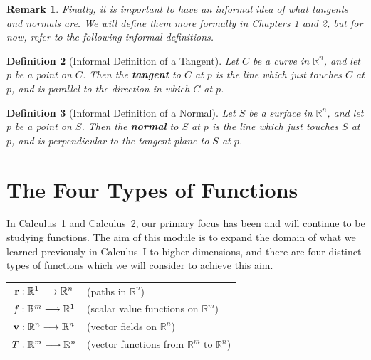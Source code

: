\documentclass[12pt]{book}
\newcommand{\rbb}{\mathbb{R}}
\newcommand{\rbbn}{\mathbb{R}^n}
\theoremstyle{definitionstyle}
\newtheorem{definition}{Definition}[section]
\newtheorem{remark}[definition]{Remark}
\numberwithin{equation}{section}
\begin{document}
\vspace{0.5cm}

\begin{remark}
    Finally, it is important to have an informal idea of what tangents and normals are. We will define them more formally in Chapters 1 and 2, but for now, refer to the following informal definitions.
\end{remark}

\vspace{0.5cm}

\begin{definition}[Informal Definition of a Tangent] 
    \noindent
    \setlength{\hangindent}{0pt}
    Let $C$ be a curve in $\rbb^n$, and let $p$ be a point on $C$. Then the \textbf{tangent} to $C$ at $p$ is the line which just touches $C$ at $p$, and is parallel to the direction in which $C$ at $p$.
\end{definition}

\vspace{0.5cm}

\begin{definition}[Informal Definition of a Normal]
    \noindent
    \setlength{\hangindent}{0pt}
    Let $S$ be a surface in $\rbb^n$, and let $p$ be a point on $S$. Then the \textbf{normal} to $S$ at $p$ is the line which just touches $S$ at $p$, and is perpendicular to the tangent plane to $S$ at $p$.
\end{definition}

\newpage

\section{The Four Types of Functions}

In Calculus~1 and Calculus~2, our primary focus has been and will continue to be studying functions. The aim of this module is to expand the domain of what we learned previously in \mbox{Calculus~I} to higher dimensions, and there are four distinct types of functions which we will consider to achieve this aim.\\

\begin{center}
    \begin{tabular}{c|l}
	$\func{\mathbf{r}}{\rbb^1}{\rbbn}$ & (paths in $\rbbn$)\\
	$\func{f}{\rbb^m}{\rbb^1}$ & (scalar value functions on $\rbb^{m}$)\\
	$\func{\mathbf{v}}{\rbb^n}{\rbbn}$ & (vector fields on $\rbbn$)\\
	$\func{T}{\rbb^m}{\rbbn}$ & (vector functions from $\rbb^m$ to $\rbbn$)
    \end{tabular}
\end{center}
\end{document}
